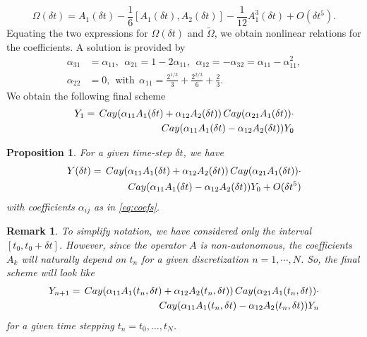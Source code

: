 \documentclass{article}
\newtheorem{proposition}{Proposition}[section]
\newtheorem{remark}{Remark}
\newcommand{\Cay}{\,{\rm Cay}}
\newcommand{\Om}{\Omega}
\begin{document}
{%
\[
\Om(\delta t) = A_1(\delta t) -\frac{1}{6} [A_1(\delta t), A_2(\delta t)] - \frac{1}{12} A_1^3(\delta t) + O(\delta t^5).
\]
%
Equating the two expressions for $\Omega(\delta t)$ and $\tilde\Om$, we obtain nonlinear relations for the coefficients. A solution is provided by 
%
\begin{equation}
\label{eq:coefs}
\begin{aligned}
\alpha_{31} &= \alpha_{11}, ~~ \alpha_{21} = 1 - 2\alpha_{11}, ~~ \alpha_{12} = - \alpha_{32} = \alpha_{11} - \alpha_{11}^2, \\
\alpha_{22} &= 0, ~~ \text{with} ~~ \alpha_{11}  = \frac{2^{1/3}}{3} +  \frac{2^{2/3}}{6} + \frac{2}{3}.
\end{aligned}
\end{equation}
%
We obtain the following final scheme
%
\begin{equation}
\label{eq:final-scheme}
\begin{aligned}
Y_1= \Cay(\alpha_{11}A_1(\delta t) + \alpha_{12}A_2(\delta t)) \Cay(\alpha_{21}A_1(\delta t)) \cdot & \\
\Cay(\alpha_{11}A_1(\delta t) - \alpha_{12}A_2(\delta t))Y_0 &
\end{aligned}
\end{equation}
%

\begin{proposition}
For a given time-step $\delta t$, we have
%
%
\begin{equation*}
\begin{aligned}
Y(\delta t) = \Cay(\alpha_{11}A_1(\delta t) + \alpha_{12}A_2(\delta t)) \Cay(\alpha_{21}A_1(\delta t)) \cdot & \\
\Cay(\alpha_{11}A_1(\delta t) - \alpha_{12}A_2(\delta t))Y_0 + O(\delta t^5) &
\end{aligned}
\end{equation*}
%
with coefficients $\alpha_{ij}$ as in \eqref{eq:coefs}.
\end{proposition}

\begin{remark}
To simplify notation, we have considered only the interval $[t_0, t_0+\delta t]$. However, since the operator $A$ is non-autonomous, the coefficients $A_k$ will naturally depend on $t_n$ for a given discretization $n = 1,\cdots,N$. So, the final scheme will look like
%
\[
\begin{aligned}
Y_{n+1} = \Cay(\alpha_{11}A_1(t_n,\delta t) + \alpha_{12}A_2(t_n,\delta t)) \Cay(\alpha_{21}A_1(t_n,\delta t)) \cdot & \\
\Cay(\alpha_{11}A_1(t_n,\delta t) - \alpha_{12}A_2(t_n,\delta t))Y_n&
\end{aligned}
\]
%
for a given time stepping $t_n = t_0,\ldots,t_N$.
\end{remark}

}
\end{document}
